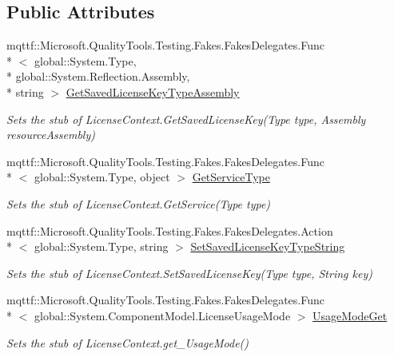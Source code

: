 \subsection*{Public Attributes}
\begin{DoxyCompactItemize}
\item 
mqttf\-::\-Microsoft.\-Quality\-Tools.\-Testing.\-Fakes.\-Fakes\-Delegates.\-Func\\*
$<$ global\-::\-System.\-Type, \\*
global\-::\-System.\-Reflection.\-Assembly, \\*
string $>$ \hyperlink{class_system_1_1_component_model_1_1_fakes_1_1_stub_license_context_a2d47a082036346eca2be8fdd2164ddb3}{Get\-Saved\-License\-Key\-Type\-Assembly}
\begin{DoxyCompactList}\small\item\em Sets the stub of License\-Context.\-Get\-Saved\-License\-Key(\-Type type, Assembly resource\-Assembly)\end{DoxyCompactList}\item 
mqttf\-::\-Microsoft.\-Quality\-Tools.\-Testing.\-Fakes.\-Fakes\-Delegates.\-Func\\*
$<$ global\-::\-System.\-Type, object $>$ \hyperlink{class_system_1_1_component_model_1_1_fakes_1_1_stub_license_context_a377208b5b5965ccb9eee88446771ba89}{Get\-Service\-Type}
\begin{DoxyCompactList}\small\item\em Sets the stub of License\-Context.\-Get\-Service(\-Type type)\end{DoxyCompactList}\item 
mqttf\-::\-Microsoft.\-Quality\-Tools.\-Testing.\-Fakes.\-Fakes\-Delegates.\-Action\\*
$<$ global\-::\-System.\-Type, string $>$ \hyperlink{class_system_1_1_component_model_1_1_fakes_1_1_stub_license_context_a175c2d501eff69e06826e0c844192437}{Set\-Saved\-License\-Key\-Type\-String}
\begin{DoxyCompactList}\small\item\em Sets the stub of License\-Context.\-Set\-Saved\-License\-Key(\-Type type, String key)\end{DoxyCompactList}\item 
mqttf\-::\-Microsoft.\-Quality\-Tools.\-Testing.\-Fakes.\-Fakes\-Delegates.\-Func\\*
$<$ global\-::\-System.\-Component\-Model.\-License\-Usage\-Mode $>$ \hyperlink{class_system_1_1_component_model_1_1_fakes_1_1_stub_license_context_afb6091f3d8e76d05287fa5e50b857d3d}{Usage\-Mode\-Get}
\begin{DoxyCompactList}\small\item\em Sets the stub of License\-Context.\-get\-\_\-\-Usage\-Mode()\end{DoxyCompactList}\end{DoxyCompactItemize}
